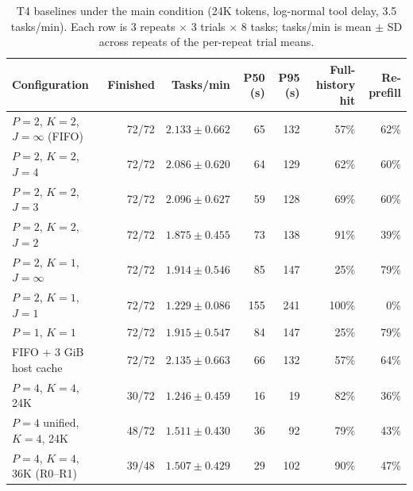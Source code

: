 \documentclass[9pt,twocolumn]{extarticle}
\begin{document}
\begin{table}[h]
\centering
\footnotesize
\setlength{\tabcolsep}{4pt}
\caption{T4 baselines under the main condition (24K tokens, log-normal tool delay, 3.5 tasks/min). Each row is 3 repeats $\times$ 3 trials $\times$ 8 tasks; tasks/min is mean $\pm$ SD across repeats of the per-repeat trial means.}
\begin{tabular}{@{}lrrrrrr@{}}
\toprule
Configuration & Finished & Tasks/min & P50 (s) & P95 (s) & Full-history hit & Re-prefill \\
\midrule
$P=2$, $K=2$, $J=\infty$ (FIFO) & 72/72 & $2.133 \pm 0.662$ & 65 & 132 & 57\% & 62\% \\
$P=2$, $K=2$, $J=4$ & 72/72 & $2.086 \pm 0.620$ & 64 & 129 & 62\% & 60\% \\
$P=2$, $K=2$, $J=3$ & 72/72 & $2.096 \pm 0.627$ & 59 & 128 & 69\% & 60\% \\
$P=2$, $K=2$, $J=2$ & 72/72 & $1.875 \pm 0.455$ & 73 & 138 & 91\% & 39\% \\
$P=2$, $K=1$, $J=\infty$ & 72/72 & $1.914 \pm 0.546$ & 85 & 147 & 25\% & 79\% \\
$P=2$, $K=1$, $J=1$ & 72/72 & $1.229 \pm 0.086$ & 155 & 241 & 100\% & 0\% \\
$P=1$, $K=1$ & 72/72 & $1.915 \pm 0.547$ & 84 & 147 & 25\% & 79\% \\
FIFO + 3 GiB host cache & 72/72 & $2.135 \pm 0.663$ & 66 & 132 & 57\% & 64\% \\
$P=4$, $K=4$, 24K & 30/72 & $1.246 \pm 0.459$ & 16 & 19 & 82\% & 36\% \\
$P=4$ unified, $K=4$, 24K & 48/72 & $1.511 \pm 0.430$ & 36 & 92 & 79\% & 43\% \\
$P=4$, $K=4$, 36K (R0--R1) & 39/48 & $1.507 \pm 0.429$ & 29 & 102 & 90\% & 47\% \\
\bottomrule
\end{tabular}
\end{table}
\end{document}
